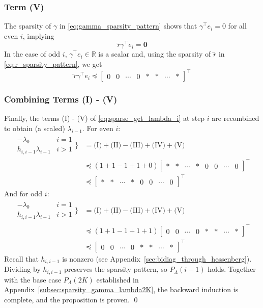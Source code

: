 \documentclass[a4paper,12pt]{article}
\theoremstyle{definition}
\begin{document}
\subsubsection{Term (V)}
The sparsity of $\gamma$ in \eqref{eq:gamma_sparsity_pattern} shows that $\gamma^\top e_i = 0$ for all even $i$, implying
$$\dddot{r}\gamma^\top e_i = \mathbf{0}$$
In the case of odd $i$, $\gamma^\top e_i \in \mathbb{R}$ is a scalar and, using the sparsity of $\dddot{r}$ in \eqref{eq:r_sparsity_pattern}, we get 
$$\dddot{r}\gamma^\top e_i \preceq \begin{bmatrix} 0 & 0 & \cdots &  0 & * & * &\cdots & *\end{bmatrix} ^\top$$
\subsubsection{Combining Terms (I) - (V)}
Finally, the terms (I) - (V) of \eqref{eq:sparse_get_lambda_i} at step $i$ are recombined to obtain (a scaled) $\lambda_{i-1}$. For even $i$:
\begin{align*}
    \!\!\!\!\!\begin{array}{cc}
        - \lambda_0 & \!\!i = 1 \\
      h_{i, i\!-\!1} \lambda_{i\!-\!1} & \!\!i > 1
   \end{array}\!\!\bigg\} &= \text{(I)} + \text{(II)} - \text{(III)} + \text{(IV)} + \text{(V)}
    \\
    &\preceq (1 + 1 - 1 + 1 + 0) \begin{bmatrix} * & * & \cdots &  * & 0 & 0 &\cdots & 0\end{bmatrix} ^\top
    \\
    &\preceq \begin{bmatrix} * & * & \cdots &  * & 0 & 0 &\cdots & 0\end{bmatrix} ^\top
\end{align*}
And for odd $i$:
\begin{align*}
    \!\!\!\!\!\begin{array}{cc}
        - \lambda_0 & \!\!i = 1 \\
      h_{i, i\!-\!1} \lambda_{i\!-\!1} & \!\!i > 1
   \end{array}\!\!\bigg\} &= \text{(I)} + \text{(II)} - \text{(III)} + \text{(IV)} + \text{(V)}
    \\
    &\preceq (1 + 1 - 1 + 1 + 1) \begin{bmatrix} 0 & 0 & \cdots &  0 & * & * &\cdots & *\end{bmatrix} ^\top
    \\
    &\preceq \begin{bmatrix} 0 & 0 & \cdots &  0 & * & * &\cdots & *\end{bmatrix} ^\top
\end{align*}
Recall that $h_{i, i-1}$ is nonzero (see Appendix~\ref{sec:bidiag_through_hessenberg}). Dividing by $h_{i,i-1}$ preserves the sparsity pattern, so $P_\Lambda(i-1)$ holds. Together with the base case $P_\Lambda(2K)$ established in Appendix~\ref{subsec:sparsity_gamma_lambda2K}, the backward induction is complete, and the proposition is proven. \qed
\end{document}
